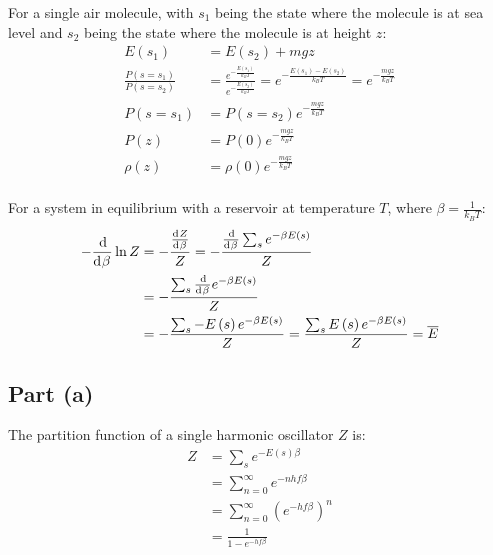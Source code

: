 \documentclass{article}
\begin{document}
\clearpage

For a single air molecule, with $s_1$ being the state where the molecule is at sea level and $s_2$ being the state where the molecule is at height $z$:
\begin{equation}
    \begin{split}
        E\left(s_1\right) & = E\left(s_2\right) + mgz \\
        \frac{P\left(s = s_1\right)}{P\left(s = s_2\right)} & = \frac{e^{-\frac{E\left(s_1\right)}{k_BT}}}{e^{-\frac{E\left(s_2\right)}{k_BT}}} = e^{-\frac{E\left(s_1\right) - E\left(s_2\right)}{k_BT}} = e^{-\frac{mgz}{k_BT}} \\
        P\left(s = s_1\right) & = P\left(s = s_2\right)e^{-\frac{mgz}{k_BT}} \\
        P\left(z\right) & = P\left(0\right)e^{-\frac{mgz}{k_BT}} \\
        \rho\left(z\right) & = \rho\left(0\right)e^{-\frac{mgz}{k_BT}} \\
    \end{split}
\end{equation}

\clearpage

For a system in equilibrium with a reservoir at temperature $T$, where $\beta = \frac{1}{k_BT}$:
\begin{equation}
    \begin{split}
        -\deriv{}{\beta} \ln{Z} & = -\frac{\deriv{Z}{\beta}}{Z} = -\frac{\deriv{}{\beta}\sum_s e^{-\beta E\left(s\right)}}{Z} \\
        & = -\frac{\sum_s \deriv{}{\beta} e^{-\beta E\left(s\right)}}{Z} \\
        & = -\frac{\sum_s -E\left(s\right)e^{-\beta E\left(s\right)}}{Z} = \frac{\sum_s E\left(s\right)e^{-\beta E\left(s\right)}}{Z} = \overline{E}
    \end{split}
\end{equation}

\clearpage

\subsection*{Part (a)}
The partition function of a single harmonic oscillator $Z$ is:
\begin{equation}
    \begin{split}
        Z & = \sum_s e^{-E\left(s\right)\beta} \\
        & = \sum_{n=0}^\infty e^{-nhf\beta} \\
        & = \sum_{n=0}^\infty {\left(e^{-hf\beta}\right)}^n \\
        & = \frac{1}{1 - e^{-hf\beta}}
    \end{split}
\end{equation}
\end{document}
